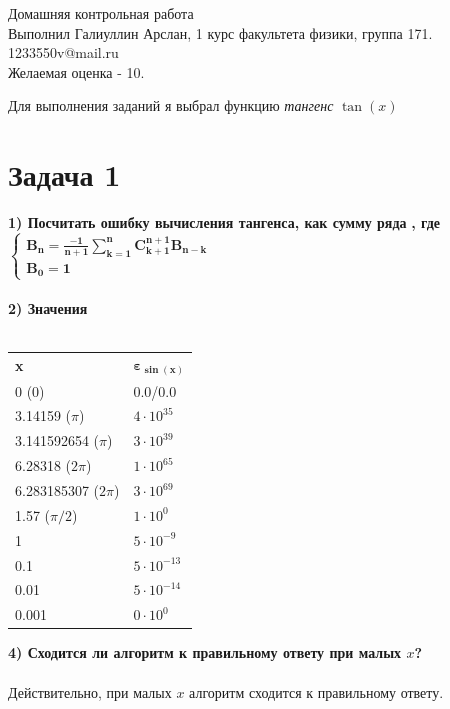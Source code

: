 \documentclass[12pt,a4paper]{scrartcl}
\author{А. А. Галиуллин}
\begin{document}
	
	\begin{center}
		\large
		Домашняя контрольная работа \\
		Выполнил Галиуллин Арслан, 1 курс факультета физики, группа 171. \\
		1233550v@mail.ru \\
		Желаемая оценка - 10.
	\end{center}

	Для выполнения заданий я выбрал функцию \textit{тангенс} $\tan(x)$	
	\section{Задача 1}
		\textbf{1) Посчитать ошибку вычисления тангенса, как сумму ряда}  \textbf{, где }
		 $\begin{cases}
			\bm{B_{n} = \frac{-1}{n+1} \sum_{k=1}^{n}C_{k+1}^{n+1}B_{n-k}} 
			\\
			\bm{B_0 = 1}
		\end{cases}$
		\\ \\
		
			
		\textbf{2) Значения} \\ \\
			\begin{center}
				\begin{tabular}{ l l }
					\textbf{x} & $\bm{\varepsilon_{\sin(x)}}$ \\
					0 ($0$) & 0.0/0.0 \\
					3.14159 ($\pi$) & $4 \cdot 10^{35}$ \\
					3.141592654 ($\pi$) & $3 \cdot 10^{39}$ \\
					6.28318 ($2\pi$) & $1 \cdot 10^{65}$ \\
					6.283185307 ($2\pi$) & $3 \cdot 10^{69}$ \\
					1.57 ($\pi/2$) & $1 \cdot 10^{0}$ \\
					1 & $5 \cdot 10^{-9}$ \\
					0.1 & $5 \cdot 10^{-13}$ \\
					0.01 & $5 \cdot 10^{-14}$ \\
					0.001 & $0 \cdot 10^{0}$ \\
				\end{tabular}
			\end{center}
			
		\textbf{4) Сходится ли алгоритм к правильному ответу при малых $x$?} \\ \\
			Действительно, при малых $x$ алгоритм сходится к правильному ответу. 
			
\end{document}

